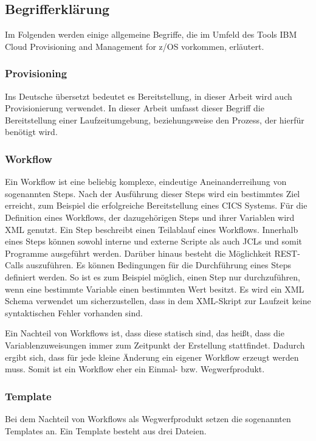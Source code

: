 \subsection{Begrifferklärung}
Im Folgenden werden einige allgemeine Begriffe, die im Umfeld des Tools \glqq IBM Cloud Provisioning and Management for z/OS\grqq{} vorkommen, erläutert.

\subsubsection{Provisioning}
Ins Deutsche übersetzt bedeutet es Bereitstellung, in dieser Arbeit wird auch Provisionierung verwendet.
In dieser Arbeit umfasst dieser Begriff die Bereitstellung einer Laufzeitumgebung, beziehungsweise den Prozess, der hierfür benötigt wird.

\subsubsection{Workflow}\label{sssec:workflow}
Ein Workflow ist eine beliebig komplexe, eindeutige Aneinanderreihung von sogenannten Steps.
Nach der Ausführung dieser Steps wird ein bestimmtes Ziel erreicht, zum Beispiel die erfolgreiche Bereitstellung eines CICS Systems.
Für die Definition eines Workflows, der dazugehörigen Steps und ihrer Variablen wird XML genutzt.
Ein Step beschreibt einen Teilablauf eines Workflows.
Innerhalb eines Steps können sowohl interne und externe Scripte als auch JCLs und somit Programme ausgeführt werden.
Darüber hinaus besteht die Möglichkeit REST-Calls auszuführen.
Es können Bedingungen für die Durchführung eines Steps definiert werden.
So ist es zum Beispiel möglich, einen Step nur durchzuführen, wenn eine bestimmte Variable einen bestimmten Wert besitzt.
Es wird ein XML Schema verwendet um sicherzustellen, dass in dem XML-Skript zur Laufzeit keine syntaktischen Fehler vorhanden sind.
\cite{Rotthove.2018}

Ein Nachteil von Workflows ist, dass diese statisch sind, das heißt, dass die Variablenzuweisungen immer zum Zeitpunkt der Erstellung stattfindet.
Dadurch ergibt sich, dass für jede kleine Änderung ein eigener Workflow erzeugt werden muss.
Somit ist ein Workflow eher ein Einmal- bzw. Wegwerfprodukt.

\subsubsection{Template}
Bei dem Nachteil von Workflows als Wegwerfprodukt setzen die sogenannten Templates an.
Ein Template besteht aus drei Dateien.

